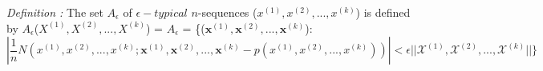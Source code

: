\documentclass[preview]{standalone}
\begin{document}
\begin{center}
\textit{Definition :} The set $A_{\epsilon}$ of $\epsilon -typical$ $n$-sequences ($x^{(1)},x^{(2)},...,x^{(k)}$) is defined by $A_{\epsilon}$($X^{(1)},X^{(2)},...,X^{(k)}$) = $A_{\epsilon}$ = \{($\textbf{x}^{(1)},\textbf{x}^{(2)},...,\textbf{x}^{(k)}$):$$|\frac{1}{n} N ( x^{(1)},x^{(2)},...,x^{(k)};\textbf{x}^{(1)},\textbf{x}^{(2)},...,\textbf{x}^{(k)} - p(x^{(1)},x^{(2)},...,x^{(k)}) )| < \epsilon ||\mathscr{X}^{(1)},\mathscr{X}^{(2)},...,\mathscr{X}^{(k)}|| \}$$
\end{center}
\end{document}

